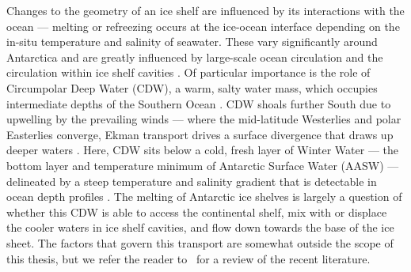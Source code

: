 Changes to the geometry of an ice shelf are influenced by its interactions with the ocean --- melting or refreezing occurs at the ice-ocean interface depending on the in-situ temperature and salinity of seawater. These vary significantly around Antarctica and are greatly influenced by large-scale ocean circulation and the circulation within ice shelf cavities \citep{wangMultiscaleOceanicHeat2023}. Of particular importance is the role of Circumpolar Deep Water (CDW), a warm, salty water mass, which occupies intermediate depths of the Southern Ocean \citep{wangWaterMassesSouthern2025}. CDW shoals further South due to upwelling by the prevailing winds --- where the mid-latitude Westerlies and polar Easterlies converge, Ekman transport drives a surface divergence that draws up deeper waters \citep{marshallClosureMeridionalOverturning2012}. Here, CDW sits below a cold, fresh layer of Winter Water --- the bottom layer and temperature minimum of Antarctic Surface Water (AASW) --- delineated by a steep temperature and salinity gradient that is detectable in ocean depth profiles \citep{wangWaterMassesSouthern2025}. The melting of Antarctic ice shelves is largely a question of whether this CDW is able to access the continental shelf, mix with or displace the cooler waters in ice shelf cavities, and flow down towards the base of the ice sheet. The factors that govern this transport are somewhat outside the scope of this thesis, but we refer the reader to~\cite{wangMultiscaleOceanicHeat2023} for a review of the recent literature.

